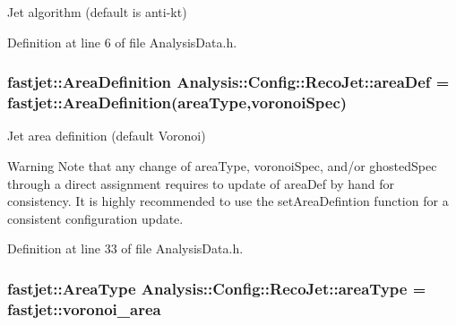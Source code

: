 Jet algorithm (default is anti-\/kt) 



Definition at line 6 of file Analysis\+Data.\+h.

\subsubsection[{\texorpdfstring{area\+Def}{areaDef}}]{\setlength{\rightskip}{0pt plus 5cm}fastjet\+::\+Area\+Definition Analysis\+::\+Config\+::\+Reco\+Jet\+::area\+Def = fastjet\+::\+Area\+Definition({\bf area\+Type},{\bf voronoi\+Spec})\hspace{0.3cm}{\ttfamily [static]}}\hypertarget{namespaceAnalysis_1_1Config_1_1RecoJet_a327f69062972ac03aac1dd7464fe778b}{}\label{namespaceAnalysis_1_1Config_1_1RecoJet_a327f69062972ac03aac1dd7464fe778b}


Jet area definition (default Voronoi) 

\begin{DoxyWarning}{Warning}
Note that any change of {\ttfamily area\+Type}, {\ttfamily voronoi\+Spec}, and/or {\ttfamily ghosted\+Spec} through a direct assignment requires to update of {\ttfamily area\+Def} by hand for consistency. It is highly recommended to use the {\ttfamily set\+Area\+Defintion} function for a consistent configuration update. 
\end{DoxyWarning}


Definition at line 33 of file Analysis\+Data.\+h.

\subsubsection[{\texorpdfstring{area\+Type}{areaType}}]{\setlength{\rightskip}{0pt plus 5cm}fastjet\+::\+Area\+Type Analysis\+::\+Config\+::\+Reco\+Jet\+::area\+Type = fastjet\+::voronoi\+\_\+area\hspace{0.3cm}{\ttfamily [static]}}\hypertarget{namespaceAnalysis_1_1Config_1_1RecoJet_a7c2d1fae6f1b2f14bf18c5a2ac3d106f}{}\label{namespaceAnalysis_1_1Config_1_1RecoJet_a7c2d1fae6f1b2f14bf18c5a2ac3d106f}


